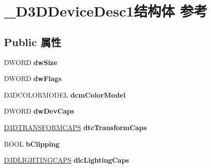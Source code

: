\hypertarget{struct___d3_d_device_desc1}{}\section{\+\_\+\+D3\+D\+Device\+Desc1结构体 参考}
\label{struct___d3_d_device_desc1}
\subsection*{Public 属性}
\begin{DoxyCompactItemize}
\item 
\mbox{\label{struct___d3_d_device_desc1_a328461b1c1aff692ad51f4d0d373c0ab}} 
D\+W\+O\+RD {\bfseries dw\+Size}
\item 
\mbox{\label{struct___d3_d_device_desc1_a2c75fb7d5bf4392796f7bd97da5d8fcc}} 
D\+W\+O\+RD {\bfseries dw\+Flags}
\item 
\mbox{\label{struct___d3_d_device_desc1_a332de6c4b3fec59afab6c8a54a2dada2}} 
D3\+D\+C\+O\+L\+O\+R\+M\+O\+D\+EL {\bfseries dcm\+Color\+Model}
\item 
\mbox{\label{struct___d3_d_device_desc1_adbcbd95ebadcac6566cf3f22a5cdb6c0}} 
D\+W\+O\+RD {\bfseries dw\+Dev\+Caps}
\item 
\mbox{\label{struct___d3_d_device_desc1_adab8ca633ee1a34853c92a159e6df02b}} 
\hyperlink{struct___d3_d_t_r_a_n_s_f_o_r_m_c_a_p_s}{D3\+D\+T\+R\+A\+N\+S\+F\+O\+R\+M\+C\+A\+PS} {\bfseries dtc\+Transform\+Caps}
\item 
\mbox{\label{struct___d3_d_device_desc1_a24ec87e719c6a360230ccdda83f0fdf8}} 
B\+O\+OL {\bfseries b\+Clipping}
\item 
\mbox{\label{struct___d3_d_device_desc1_a971c33a22e137d741f3d5636289cdca7}} 
\hyperlink{struct___d3_d_l_i_g_h_t_i_n_g_c_a_p_s}{D3\+D\+L\+I\+G\+H\+T\+I\+N\+G\+C\+A\+PS} {\bfseries dlc\+Lighting\+Caps}
\item 
\mbox{\label{struct___d3_d_device_desc1_a61c8c42e1812aae379a5fcd0b201b15a}} 

\end{DoxyCompactItemize}
